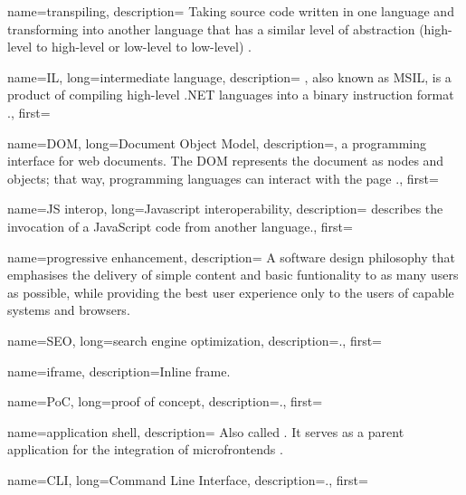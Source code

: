 {
    name=transpiling, 
    description={
        Taking source code written in one language and transforming into another
    language that has a similar level of abstraction (high-level to
    high-level or low-level to low-level) \autocite{Fenton_2012}.
    }
}

{
    name=IL,
    long={intermediate language},
    description={
    , also known as MSIL, is a product of compiling high-level
    .NET languages into a binary instruction format \autocite{Microsoft_2016}.},
    first=
}

{
    name=DOM, 
    long={Document Object Model}, 
    description={, a programming interface for web documents.
    The DOM represents the document as nodes and objects; that way, programming
    languages can interact with the page \autocite{Mozilla_DOM}.}, 
    first=}

{
    name={JS interop},
    long={Javascript interoperability},
    description={ describes the invocation of a
    JavaScript code from another language.},
    first=
}

{
    name={progressive enhancement},
    description={
    A software design philosophy that emphasises the delivery of simple content
    and basic funtionality to as many users as possible, while providing the
    best user experience only to the users of capable systems and browsers.
    }
}

{
    name=SEO,
    long={search engine optimization},
    description={.},
    first=
}

{
    name=iframe,
    description={Inline frame.}
}

{
    name=PoC,
    long={proof of concept},
    description={.},
    first=
}

{
    name={application shell},
    description={
    Also called . It serves as a parent application for the
    integration of microfrontends \autocite{Geers_2020}\autocite{Rappl_2021}.
    }
}

{
    name=CLI,
    long={Command Line Interface},
    description={.},
    first=
}

